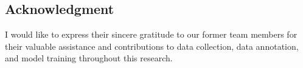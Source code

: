 \documentclass[11pt,a4paper]{article}
\begin{document}





\subsection*{Acknowledgment}
I would like to express their sincere gratitude to our former team members for their valuable assistance and contributions to data collection, data annotation, and model training throughout this research.



% 
% 












\end{document}
